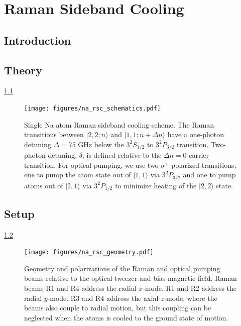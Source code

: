 
\chapter{Raman Sideband Cooling}
\label{ch:rsc}

\section{Introduction}

\section{Theory}

\ref{fig:na-rsc-schematics}

\begin{figure}
  \centering
  \texttt{[image: figures/na\_rsc\_schematics.pdf]}
  \caption[Schematics of Raman sideband cooling for Sodium.]{
    Single Na atom Raman sideband cooling scheme.
    The Raman transitions between $|2,2;n\rangle$ and $|1,1;n+\Delta n\rangle$
    have a one-photon detuning $\Delta=75$ GHz below the $3^2S_{1/2}$ to $3^2P_{3/2}$ transition.
    Two-photon detuning, $\delta$, is defined relative to the $\Delta n=0$ carrier transition.
    For optical pumping, we use two $\sigma^+$ polarized transitions,
    one to pump the atom state out of $|1,1\rangle$ via $3^2P_{3/2}$
    and one to pump atoms out of $|2,1\rangle$ via $3^2P_{1/2}$
    to minimize heating of the $|2,2\rangle$ state.
    \label{fig:na-rsc-schematics}}
\end{figure}

\section{Setup}

\ref{fig:na-rsc-geometry}

\begin{figure}
  \centering
  \texttt{[image: figures/na\_rsc\_geometry.pdf]}
  \caption[Beams and field geometry for Sodium Raman sideband cooling]{
    Geometry and polarizations of the Raman and optical pumping beams relative to the
    optical tweezer and bias magnetic field.
    Raman beams R1 and R4 address the radial $x$-mode.
    R1 and R2 address the radial $y$-mode.
    R3 and R4 address the axial $z$-mode, where the beams also couple to radial motion,
    but this coupling can be neglected when the atoms is cooled to the ground state of motion.
    \label{fig:na-rsc-geometry}}
\end{figure}

